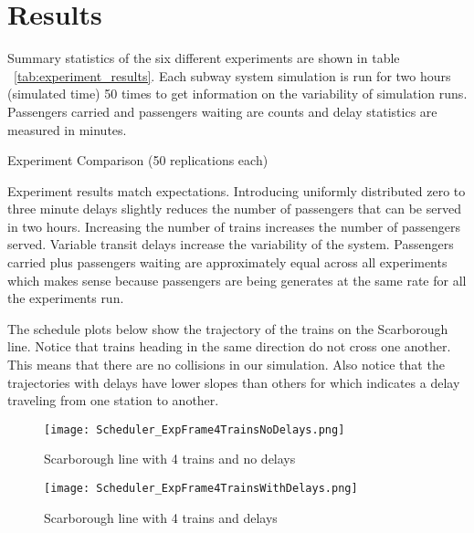 \section{Results}

Summary statistics of the six different experiments are shown in table
~\ref{tab:experiment_results}. Each subway system simulation is run for two
hours (simulated time) 50 times to get information on the variability of
simulation runs. Passengers carried and passengers waiting are counts and 
delay statistics are measured in minutes.

\begin{sidewaystable}
    \centering
    \caption{Experiment Comparison (50 replications each)}
    \label{tab:experiment_results}
\end{sidewaystable}

Experiment results match expectations. Introducing uniformly distributed zero
to three minute delays slightly reduces the number of passengers that can be 
served in two hours. Increasing the number of trains increases the number of 
passengers served. Variable transit delays increase the variability of the system.
Passengers carried plus passengers waiting are approximately equal across all
experiments which makes sense because passengers are being generates at the
same rate for all the experiments run.

The schedule plots below show the trajectory of the trains on the Scarborough
line. Notice that trains heading in the same direction do not cross one
another. This means that there are no collisions in our simulation. Also notice
that the trajectories with delays have lower slopes than others for which
indicates a delay traveling from one station to another.

\begin{figure}[tb]
	\centering
	\texttt{[image: Scheduler\_ExpFrame4TrainsNoDelays.png]}
	\caption{Scarborough line with 4 trains and no delays}\label{fig:4trainsNoDelay}
\end{figure}

\begin{figure}[tb]
	\centering
	\texttt{[image: Scheduler\_ExpFrame4TrainsWithDelays.png]}
	\caption{Scarborough line with 4 trains and delays}\label{fig:4trainsWithDelay}
\end{figure}


